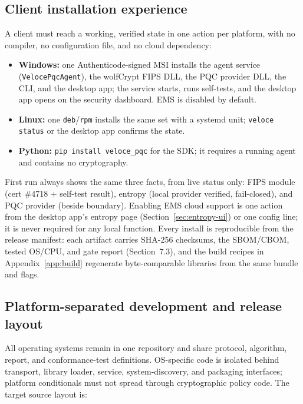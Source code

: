 \documentclass[10pt]{article}
\newcommand{\code}[1]{\texttt{\small #1}}
\begin{document}
\subsection{Client installation experience}\label{sec:install-ux}

A client must reach a working, verified state in one action per platform, with no
compiler, no configuration file, and no cloud dependency:

\begin{itemize}
  \item \textbf{Windows:} one Authenticode-signed MSI installs the agent service
        (\code{VelocePqcAgent}), the wolfCrypt FIPS DLL, the PQC provider DLL, the CLI,
        and the desktop app; the service starts, runs self-tests, and the desktop app
        opens on the security dashboard. EMS is disabled by default.
  \item \textbf{Linux:} one \code{deb}/\code{rpm} installs the same set with a systemd
        unit; \code{veloce status} or the desktop app confirms the state.
  \item \textbf{Python:} \code{pip install veloce\_pqc} for the SDK; it requires a
        running agent and contains no cryptography.
\end{itemize}

First run always shows the same three facts, from live status only: FIPS module
(cert \#4718 + self-test result), entropy (local provider verified, fail-closed), and
PQC provider (beside boundary). Enabling EMS cloud support is one action from the
desktop app's entropy page (Section~\ref{sec:entropy-ui}) or one config line; it is
never required for any local function. Every install is reproducible from the release
manifest: each artifact carries SHA-256 checksums, the SBOM/CBOM, tested OS/CPU, and
gate report (Section~7.3), and the build recipes in Appendix~\ref{app:build} regenerate
byte-comparable libraries from the same bundle and flags.

\subsection{Platform-separated development and release layout}
All operating systems remain in one repository and share protocol, algorithm, report,
and conformance-test definitions. OS-specific code is isolated behind transport, library
loader, service, system-discovery, and packaging interfaces; platform conditionals must
not spread through cryptographic policy code. The target source layout is:
\end{document}
